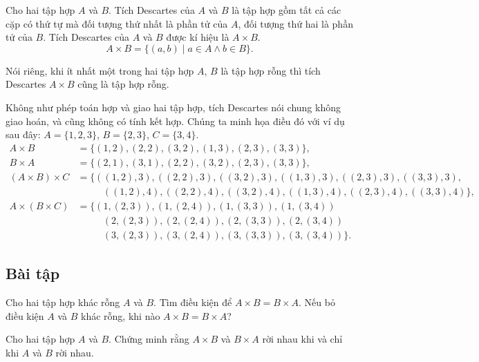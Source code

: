 \begin{definition}
    Cho hai tập hợp $A$ và $B$. Tích Descartes của $A$ và $B$ là tập hợp gồm tất cả các cặp có thứ tự mà đối tượng thứ nhất là phần tử của $A$, đối tượng thứ hai là phần tử của $B$. Tích Descartes của $A$ và $B$ được kí hiệu là $A\times B$.
    \[
        A\times B = \{ (a, b) \mid a\in A \wedge b\in B \}.
    \]
\end{definition}

Nói riêng, khi ít nhất một trong hai tập hợp $A$, $B$ là tập hợp rỗng thì tích Descartes $A\times B$ cũng là tập hợp rỗng.

Không như phép toán hợp và giao hai tập hợp, tích Descartes nói chung không giao hoán, và cũng không có tính kết hợp. Chúng ta minh họa điều đó với ví dụ sau đây: $A = \{ 1, 2, 3 \}$, $B = \{ 2, 3 \}$, $C = \{ 3, 4 \}$.
\[
    \begin{split}
        A\times B & = \{ (1, 2), (2, 2), (3, 2), (1, 3), (2, 3), (3, 3) \}, \\
        B\times A & = \{ (2, 1), (3, 1), (2, 2), (3, 2), (2, 3), (3, 3) \}, \\
        (A\times B)\times C & = \{ ((1, 2), 3), ((2, 2), 3), ((3, 2), 3), ((1, 3), 3), ((2, 3), 3), ((3, 3), 3), \\
        & \phantom{==} ((1, 2), 4), ((2, 2), 4), ((3, 2), 4), ((1, 3), 4), ((2, 3), 4), ((3, 3), 4) \}, \\
        A\times (B\times C) & = \{ (1, (2, 3)), (1, (2, 4)), (1, (3, 3)), (1, (3, 4)) \\
        & \phantom{==} (2, (2, 3)), (2, (2, 4)), (2, (3, 3)), (2, (3, 4)) \\
        & \phantom{==} (3, (2, 3)), (3, (2, 4)), (3, (3, 3)), (3, (3, 4)) \}.
    \end{split}
\]

\subsection{Bài tập}
\setcounter{exercise}{0}

\begin{exercise}\label{cartesian-product:exercise1}
    Cho hai tập hợp khác rỗng $A$ và $B$. Tìm điều kiện để $A\times B = B\times A$. Nếu bỏ điều kiện $A$ và $B$ khác rỗng, khi nào $A\times B = B\times A$?
\end{exercise}

\begin{exercise}\label{cartesian-product:exercise2}
    Cho hai tập hợp $A$ và $B$. Chứng minh rằng $A\times B$ và $B\times A$ rời nhau khi và chỉ khi $A$ và $B$ rời nhau.
\end{exercise}

